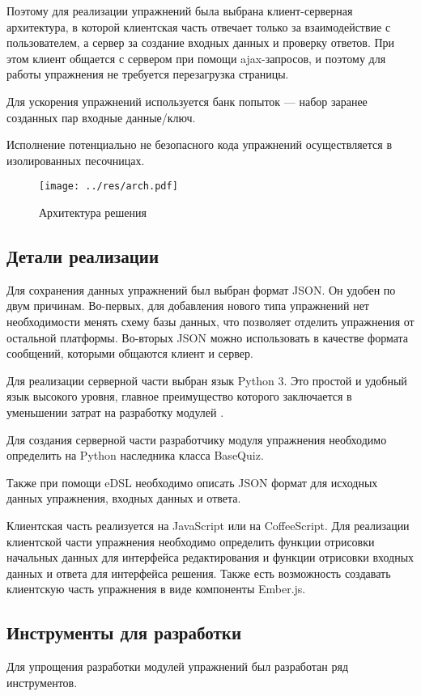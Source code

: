 \documentclass{matmex-diploma-custom}
\begin{document}
Поэтому для реализации упражнений была выбрана клиент-серверная
архитектура, в которой клиентская часть отвечает только за
взаимодействие с пользователем, а сервер за создание входных данных и
проверку ответов. При этом клиент общается с сервером при помощи
ajax-запросов, и поэтому для работы упражнения не требуется
перезагрузка страницы.

Для ускорения упражнений используется банк попыток --- набор
заранее созданных пар входные данные/ключ.

Исполнение потенциально не безопасного кода упражнений осуществляется
в изолированных песочницах.

\begin{figure}
  \texttt{[image: ../res/arch.pdf]}
  \caption{Архитектура решения}
\end{figure}

\subsection{Детали реализации}
Для сохранения данных упражнений был выбран формат JSON. Он удобен по
двум причинам. Во-первых, для добавления нового типа упражнений нет
необходимости менять схему базы данных, что позволяет отделить
упражнения от остальной платформы. Во-вторых JSON можно использовать в
качестве формата сообщений, которыми общаются клиент и сервер.

Для реализации серверной части выбран язык Python 3. Это простой и
удобный язык высокого уровня, главное преимущество которого
заключается в уменьшении затрат на разработку модулей  \cite{pyprod}.

Для создания серверной части разработчику модуля упражнения необходимо
определить на Python наследника класса BaseQuiz.

Также при помощи eDSL необходимо описать JSON формат для исходных
данных упражнения, входных данных и ответа.

Клиентская часть реализуется на JavaScript или на CoffeeScript. Для
реализации клиентской части упражнения необходимо определить функции
отрисовки начальных данных для интерфейса редактирования и функции
отрисовки входных данных и ответа для интерфейса решения. Также есть
возможность создавать клиентскую часть упражнения в виде компоненты Ember.js.

\subsection{Инструменты для разработки}
Для упрощения разработки модулей упражнений был разработан ряд
инструментов.
\end{document}
